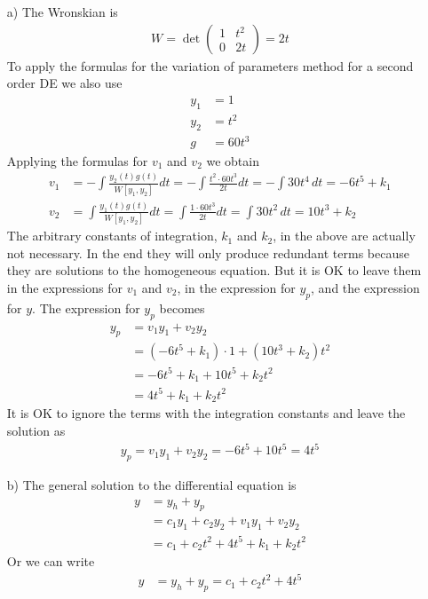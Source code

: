\begin{enumerate}
    \item[a)] The Wronskian is
\begin{align}
    W = \det \begin{pmatrix} 1&t^2\\0&2t\end{pmatrix} = 2t
\end{align}
To apply the formulas for the variation of parameters method for a second order DE we also use
\begin{align}
    y_1 & = 1 \\
    y_2 &= t^2 \\
    g &= 60t^3 
\end{align}
Applying the formulas for $v_1$ and $v_2$ we obtain
\begin{align}
    v_1 &= - \int \frac{y_2(t)g(t)}{W[y_1,y_2]}dt = - \int \frac{t^2 \cdot 60t^3}{2t} dt = - \int 30 t^4 \, dt = -6t^5 + k_1\\
    v_2 &= \int \frac{y_1(t)g(t)}{W[y_1,y_2]} dt = \int \frac{1\cdot60t^3}{2t} dt = \int 30 t^2 \, dt = 10t^3 + k_2
\end{align}
The arbitrary constants of integration, $k_1$ and $k_2$, in the above are actually not necessary. In the end they will only produce redundant terms because they are solutions to the homogeneous equation. But it is OK to leave them in the expressions for $v_1$ and $v_2$, in the expression for $y_p$, and the expression for $y$. The expression for $y_p$ becomes
\begin{align}
    y_p &= v_1y_1 + v_2y_2 \\
    &= (-6t^5 + k_1)\cdot 1 + (10t^3 + k_2) t^2 \\
    &= -6t^5 + k_1 + 10t^5 + k_2 t^2 \\
    &= 4t^5 + k_1 + k_2t^2
\end{align}
It is OK to ignore the terms with the integration constants and leave the solution as
\begin{align}
    y_p = v_1y_1 + v_2y_2 = -6t^5  + 10t^5 = 4t^5
\end{align}
\item [b)] The general solution to the differential equation is
\begin{align}
    y &= y_h + y_p \\
    &= c_1y_1 + c_2y_2 + v_1y_1 + v_2y_2 \\
    &= c_1 +c_2t^2 + 4t^5 + k_1  + k_2 t^2
\end{align}
Or we can write
\begin{align}
    y &= y_h + y_p  = c_1 +c_2t^2 + 4t^5 
\end{align}
\end{enumerate}